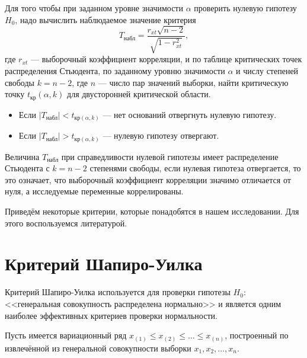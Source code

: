 Для того чтобы при заданном уровне значимости $\alpha$ проверить нулевую гипотезу $H_0$, надо вычислить наблюдаемое значение критерия
\begin{equation*}
	T_{\textrm{набл}} = \frac{r_{xt}\sqrt{n - 2}}{\sqrt{1 - r_{xt}^{2}}},
\end{equation*}
где $r_{xt}$ --- выборочный коэффициент корреляции, и по таблице критических точек распределения Стьюдента, по заданному уровню значимости $\alpha$ и числу степеней свободы $k = n - 2$, где $n$ --- число пар значений выборки, найти критическую точку $t_{\textrm{кр}}(\alpha, k)$ для двусторонней критической области.
\begin{itemize}
	\item Если $\vert T_{\textrm{набл}} \vert < t_{\textrm{кр}(\alpha, k)}$ --- нет оснований отвергнуть нулевую гипотезу.
	\item Если $\vert T_{\textrm{набл}} \vert > t_{\textrm{кр}(\alpha, k)}$ --- нулевую гипотезу отвергают.
\end{itemize}

Величина $T_{\textrm{набл}}$ при справедливости нулевой гипотезы имеет распределение Стьюдента с $k = n - 2$ степенями свободы, если нулевая гипотеза отвергается, то это означает, что выборочный коэффициент корреляции значимо отличается от нуля, а исследуемые переменные коррелированы.


Приведём некоторые критерии, которые понадобятся в нашем исследовании. Для этого воспользуемся литературой.

\section*{Критерий Шапиро-Уилка} %
\label{sec:shapiro_wilk}

Критерий Шапиро-Уилка используется для проверки гипотезы $H_0$: <<генеральная совокупность распределена нормально>> и является одним наиболее эффективных критериев проверки нормальности. 

Пусть имеется вариационный ряд $x_{(1)} \le x_{(2)} \le \ldots \le x_{(n)}$, построенный по извлечённой из генеральной совокупности выборки $x_1, x_2, \ldots, x_n$.

